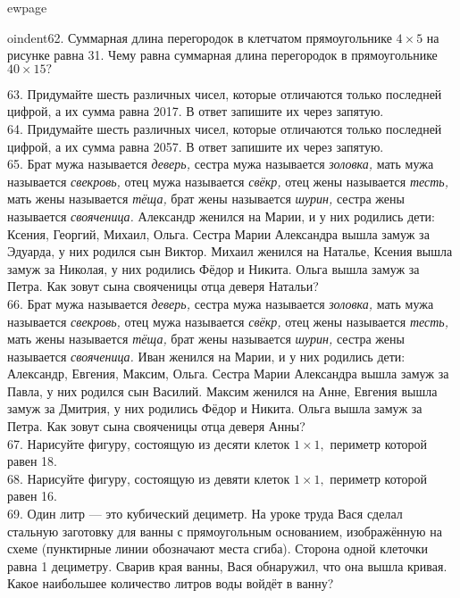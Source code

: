 ewpage

oindent62. Суммарная длина перегородок в клетчатом прямоугольнике $4\times5$ на рисунке равна 31. Чему равна суммарная длина перегородок в прямоугольнике $40\times15?$
\begin{center}
\begin{figure}[ht!]
\end{figure}
\end{center}
63. Придумайте шесть различных чисел, которые отличаются только последней цифрой, а их сумма равна 2017. В ответ запишите их через запятую.\\
64. Придумайте шесть различных чисел, которые отличаются только последней цифрой, а их сумма равна 2057. В ответ запишите их через запятую.\\
65. Брат мужа называется {\it деверь,} сестра мужа называется {\it золовка,} мать мужа называется {\it свекровь,} отец мужа называется {\it свёкр,} отец жены называется {\it тесть,} мать жены называется {\it тёща,} брат жены называется {\it шурин,} сестра жены называется {\it свояченица.} Александр женился на Марии, и у них родились дети: Ксения, Георгий, Михаил, Ольга. Сестра Марии Александра вышла замуж за Эдуарда, у них родился сын Виктор. Михаил женился на Наталье, Ксения вышла замуж за Николая, у них родились Фёдор и Никита. Ольга вышла замуж за Петра. Как зовут сына свояченицы отца деверя Натальи?\\
66.  Брат мужа называется {\it деверь,} сестра мужа называется {\it золовка,} мать мужа называется {\it свекровь,} отец мужа называется {\it свёкр,} отец жены называется {\it тесть,} мать жены называется {\it тёща,} брат жены называется {\it шурин,} сестра жены называется {\it свояченица.} Иван женился на Марии, и у них родились дети: Александр, Евгения, Максим, Ольга. Сестра Марии Александра вышла замуж за Павла, у них родился сын Василий. Максим женился на Анне, Евгения вышла замуж за Дмитрия, у них родились Фёдор и Никита. Ольга вышла замуж за Петра. Как зовут сына свояченицы отца деверя Анны?\\
67. Нарисуйте фигуру, состоящую из десяти клеток $1\times1,$ периметр которой равен 18.\\
68. Нарисуйте фигуру, состоящую из девяти клеток $1\times1,$ периметр которой равен 16.\\
69. Один литр --- это кубический дециметр. На уроке труда Вася сделал стальную заготовку для ванны с прямоугольным основанием, изображённую на схеме (пунктирные линии обозначают места сгиба). Сторона одной клеточки равна 1 дециметру. Сварив края ванны, Вася обнаружил, что она вышла кривая. Какое наибольшее количество литров воды войдёт в ванну?
